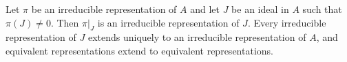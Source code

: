 Let $\pi$ be an irreducible representation of $A$ and let $J$ be an ideal in $A$ such that $\pi(J) \neq 0$. Then $\pi|_J$ is an irreducible representation of $J$. Every irreducible representation of $J$ extends uniquely to an irreducible representation of $A$, and equivalent representations extend to equivalent representations.

